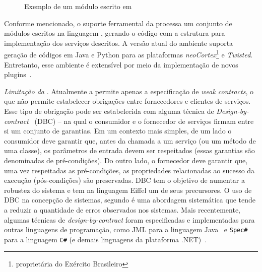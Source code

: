 \begin{figure}[htb]
\begin{scriptsize}

\end{scriptsize}
\caption{Exemplo de um módulo escrito em \neoidl}
\label{lst:modulobasiconeo}
\end{figure}


Conforme mencionado, o suporte ferramental da \neoidl{} processa um conjunto de
módulos escritos na linguagem \neoidl{}, gerando o código com a estrutura para
implementação dos serviços descritos.
A versão atual do ambiente \neoidl{} suporta geração de códigos em Java e Python
para as plataformas \emph{neoCortex}\footnote{propriet\'{a}ria do Ex\'{e}rcito
Brasileiro} e \emph{Twisted}. Entretanto, esse ambiente é extensível por meio
da implementação de novos plugins~\cite{bonifacio2015neoidl}.



\emph{Limita\c c\~{a}o da \neoidl}. Atualmente a \neoidl{} permite apenas a
especifica\c c\~{a}o de \emph{weak contracts}, o que n\~{a}o permite estabelecer
obriga\c c\~{o}es entre fornecedores e clientes de servi\c cos. Esse tipo de
obriga\c c\~{a}o pode ser estabelecida com alguma t\'{e}cnica de
\emph{Design-by-contract}~\cite{meyer1992applying} (DBC) -- na qual o consumidor
e o fornecedor de servi\c cos firmam entre si um conjunto de garantias. Em um
contexto mais simples, de um lado o consumidor deve garantir que, antes da
chamada a um servi\c co (ou um m\'{e}todo de uma classe), os parâmetros de
entrada devem ser respeitados (essas garantias s\~{a}o denominadas de
pré-condições). Do outro lado, o fornecedor deve garantir que, uma vez
respeitadas as pré-condições, as propriedades relacionadas ao sucesso da
execução (pós-condições) s\~{a}o preservadas. DBC tem o objetivo de aumentar a
robustez do sistema e tem na linguagem Eiffel \cite{meyer1991eiffel} um de seus
precursores. O uso de DBC na concepção de sistemas, segundo
\cite{EiffelDBC:2012} é uma abordagem sistemática que tende a reduzir a
quantidade de erros observados nos sistemas.
Mais recentemente, algumas t\'{e}cnicas de \emph{design-by-contract} foram
especificadas e implementadas para outras linguagens de programa\c c\~{a}o, como
JML para a linguagem Java~\cite{leavens} e \texttt{Spec\#} para a linguagem
\texttt{C\#} (e demais linguagens da plataforma .NET)~\cite{barthe}.


